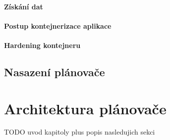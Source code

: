 \documentclass[thesis=M,czech]{FITthesis}[2019/12/23]
\theoremstyle{plain}
\theoremstyle{definition}
\begin{document}
% 

\subsubsection{Získání dat}



\subsubsection{Postup kontejnerizace aplikace}


\subsubsection{Hardening kontejneru}


\section{Nasazení plánovače}


\chapter{Architektura plánovače}

TODO uvod kapitoly plus popis nasledujich sekci
\end{document}
